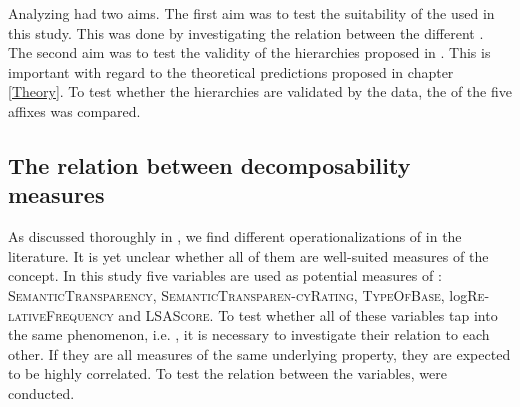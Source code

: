 Analyzing  had two aims. The first aim was to test the suitability of the  used in this study. This was done by investigating the relation between the different .  
The second aim was to test the validity of the  hierarchies proposed in .  This is important with regard to the theoretical predictions proposed in chapter \ref{Theory}. To test whether the hierarchies are validated by the data, the  of the five affixes was compared.




\subsection{The relation between decomposability measures} \label{The Relation between Decomposability Measures} 
 


As discussed thoroughly in , we find different operationalizations of  in the literature. It is yet unclear whether all of them are well-suited measures of the concept. In this study five variables are used as potential measures of : \textsc{SemanticTransparency}, \textsc{SemanticTransparen-cyRating}, \textsc{TypeOfBase}, log\textsc{Re-lativeFrequency} and \textsc{LSAScore}.
To test whether all of these variables tap into the same phenomenon, i.e. , it is necessary to investigate their relation to each other. If they are all measures of the same underlying property, they are expected to be highly correlated. To test the relation between the variables,  were conducted. 

